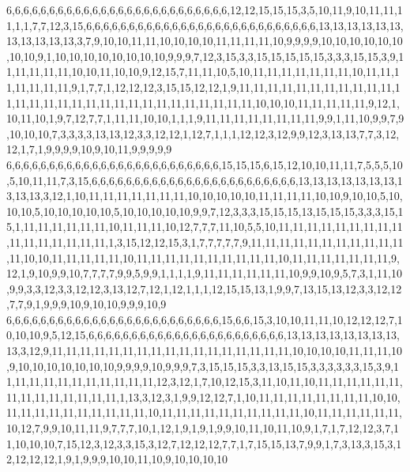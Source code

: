 6,6,6,6,6,6,6,6,6,6,6,6,6,6,6,6,6,6,6,6,6,6,6,6,6,6,12,12,15,15,15,3,5,10,11,9,10,11,11,11,1,1,7,7,12,3,15,6,6,6,6,6,6,6,6,6,6,6,6,6,6,6,6,6,6,6,6,6,6,6,6,6,6,6,13,13,13,13,13,13,13,13,13,13,13,3,7,9,10,10,11,11,10,10,10,10,11,11,11,11,10,9,9,9,9,10,10,10,10,10,10,10,10,9,1,10,10,10,10,10,10,10,10,9,9,9,7,12,3,15,3,3,15,15,15,15,15,3,3,3,15,15,3,9,11,11,11,11,11,10,10,11,10,10,9,12,15,7,11,11,10,5,10,11,11,11,11,11,11,11,10,11,11,11,11,11,11,11,9,1,7,7,1,12,12,12,3,15,15,12,12,1,9,11,11,11,11,11,11,11,11,11,11,11,11,11,11,11,11,11,11,11,11,11,11,11,11,11,11,11,11,11,10,10,10,11,11,11,11,11,9,12,1,10,11,10,1,9,7,12,7,7,1,11,11,10,10,1,1,1,9,11,11,11,11,11,11,11,11,9,9,1,11,10,9,9,7,9,10,10,10,7,3,3,3,3,13,13,12,3,3,12,12,1,12,7,1,1,1,12,12,3,12,9,9,12,3,13,13,7,7,3,12,12,1,7,1,9,9,9,9,10,9,10,11,9,9,9,9,9
6,6,6,6,6,6,6,6,6,6,6,6,6,6,6,6,6,6,6,6,6,6,6,6,6,15,15,15,6,15,12,10,10,11,11,7,5,5,5,10,5,10,11,11,7,3,15,6,6,6,6,6,6,6,6,6,6,6,6,6,6,6,6,6,6,6,6,6,6,6,6,13,13,13,13,13,13,13,13,13,13,3,12,1,10,11,11,11,11,11,11,11,10,10,10,10,10,11,11,11,11,10,10,9,10,10,5,10,10,10,5,10,10,10,10,10,5,10,10,10,10,10,9,9,7,12,3,3,3,15,15,15,13,15,15,15,3,3,3,15,15,1,11,11,11,11,11,11,10,11,11,11,10,12,7,7,7,11,10,5,5,10,11,11,11,11,11,11,11,11,11,11,11,11,11,11,11,11,1,3,15,12,12,15,3,1,7,7,7,7,7,9,11,11,11,11,11,11,11,11,11,11,11,11,10,10,11,11,11,11,11,10,11,11,11,11,11,11,11,11,11,11,10,11,11,11,11,11,11,11,9,12,1,9,10,9,9,10,7,7,7,7,9,9,5,9,9,1,1,1,1,9,11,11,11,11,11,11,10,9,9,10,9,5,7,3,1,11,10,9,9,3,3,12,3,3,12,12,3,13,12,7,12,1,12,1,1,1,12,15,15,13,1,9,9,7,13,15,13,12,3,3,12,12,7,7,9,1,9,9,9,10,9,10,10,9,9,9,10,9
6,6,6,6,6,6,6,6,6,6,6,6,6,6,6,6,6,6,6,6,6,6,6,6,6,15,6,6,15,3,10,10,11,11,10,12,12,12,7,10,10,10,9,5,12,15,6,6,6,6,6,6,6,6,6,6,6,6,6,6,6,6,6,6,6,6,6,6,6,13,13,13,13,13,13,13,13,13,3,12,9,11,11,11,11,11,11,11,11,11,11,11,11,11,11,11,11,11,10,10,10,10,11,11,11,10,9,10,10,10,10,10,10,10,9,9,9,9,10,9,9,9,7,3,15,15,15,3,3,13,15,15,3,3,3,3,3,3,15,3,9,11,11,11,11,11,11,11,11,11,11,11,12,3,12,1,7,10,12,15,3,11,10,11,10,11,11,11,11,11,11,11,11,11,11,11,11,11,11,1,13,3,12,3,1,9,9,12,12,7,1,10,11,11,11,11,11,11,11,11,10,10,11,11,11,11,11,11,11,11,11,11,10,11,11,11,11,11,11,11,11,11,11,10,11,11,11,11,11,11,10,12,7,9,9,10,11,11,9,7,7,7,10,1,12,1,9,1,9,1,9,9,10,11,10,11,10,9,1,7,1,7,12,12,3,7,11,10,10,10,7,15,12,3,12,3,3,15,3,12,7,12,12,12,7,7,1,7,15,15,13,7,9,9,1,7,3,13,3,15,3,12,12,12,12,1,9,1,9,9,9,10,10,11,10,9,10,10,10,10
